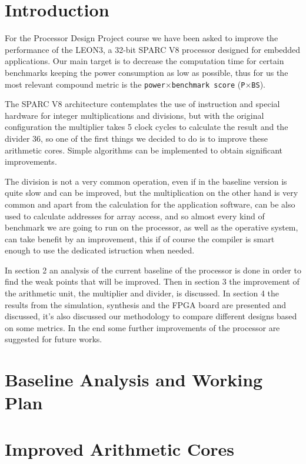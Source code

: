 
\section{Introduction}

For the Processor Design Project course we have been asked to improve the performance of the
LEON3, a 32-bit SPARC V8 processor designed for embedded applications.
Our main target is to decrease the computation time for certain benchmarks keeping the power
consumption as low as possible, thus for us the most relevant compound metric is the
\texttt{power}$\times$\texttt{benchmark score} (\texttt{P}$\times$\texttt{BS}).

The SPARC V8 architecture contemplates the use of instruction and special hardware for integer
multiplications and divisions, but with the original configuration the multiplier takes 5 clock cycles
to calculate the result and the divider 36, so one of the first things we decided to do is to improve
these arithmetic cores. Simple algorithms can be implemented to obtain significant improvements.

The division is not a very common operation, even if in the baseline version is quite slow and can be improved, but the multiplication on the other hand is very common and apart from the calculation for the application software, can be also used to calculate addresses for array access, and so almost every kind of benchmark we are going to run on the processor, as well as the operative system, can take benefit by an improvement, this if of course the compiler is smart enough to use the dedicated istruction when needed.

In section 2 an analysis of the current baseline of the processor is done in order to find the weak points that will be improved.
Then in section 3 the improvement of the arithmetic unit, the multiplier and divider, is discussed.
In section 4 the results from the simulation, synthesis and the FPGA board are presented and discussed, it's also discussed our methodology to compare different designs based on some metrics.
In the end some further improvements of the processor are suggested for future works.

\pagebreak
\section{Baseline Analysis and Working Plan}

\pagebreak
\section{Improved Arithmetic Cores}


